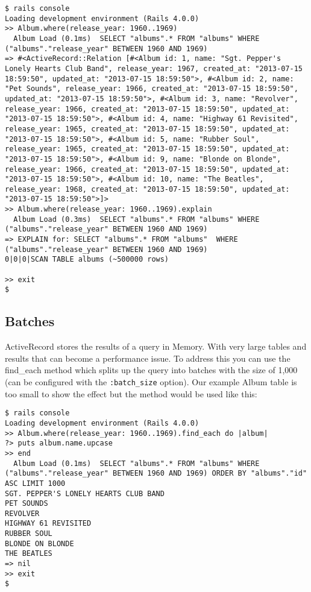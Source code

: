 \documentclass[a4paper]{book}
\newcounter{tab}[chapter]
\begin{document}
\begin{shaded}\begin{verbatim}
$ rails console
Loading development environment (Rails 4.0.0)
>> Album.where(release_year: 1960..1969)
  Album Load (0.1ms)  SELECT "albums".* FROM "albums" WHERE ("albums"."release_year" BETWEEN 1960 AND 1969)
=> #<ActiveRecord::Relation [#<Album id: 1, name: "Sgt. Pepper's Lonely Hearts Club Band", release_year: 1967, created_at: "2013-07-15 18:59:50", updated_at: "2013-07-15 18:59:50">, #<Album id: 2, name: "Pet Sounds", release_year: 1966, created_at: "2013-07-15 18:59:50", updated_at: "2013-07-15 18:59:50">, #<Album id: 3, name: "Revolver", release_year: 1966, created_at: "2013-07-15 18:59:50", updated_at: "2013-07-15 18:59:50">, #<Album id: 4, name: "Highway 61 Revisited", release_year: 1965, created_at: "2013-07-15 18:59:50", updated_at: "2013-07-15 18:59:50">, #<Album id: 5, name: "Rubber Soul", release_year: 1965, created_at: "2013-07-15 18:59:50", updated_at: "2013-07-15 18:59:50">, #<Album id: 9, name: "Blonde on Blonde", release_year: 1966, created_at: "2013-07-15 18:59:50", updated_at: "2013-07-15 18:59:50">, #<Album id: 10, name: "The Beatles", release_year: 1968, created_at: "2013-07-15 18:59:50", updated_at: "2013-07-15 18:59:50">]>
>> Album.where(release_year: 1960..1969).explain
  Album Load (0.3ms)  SELECT "albums".* FROM "albums" WHERE ("albums"."release_year" BETWEEN 1960 AND 1969)
=> EXPLAIN for: SELECT "albums".* FROM "albums"  WHERE ("albums"."release_year" BETWEEN 1960 AND 1969)
0|0|0|SCAN TABLE albums (~500000 rows)

>> exit
$
\end{verbatim}\end{shaded}

\subsection{Batches}\label{batches}

ActiveRecord stores the results of a query in Memory. With very large tables and results that can become a performance issue. To address this you can use the find\_each method which splits up the query into batches with the size of 1,000 (can be configured with the \texttt{:batch\_size} option). Our example Album table is too small to show the effect but the method would be used like this:

\begin{shaded}\begin{verbatim}
$ rails console
Loading development environment (Rails 4.0.0)
>> Album.where(release_year: 1960..1969).find_each do |album|
?> puts album.name.upcase
>> end
  Album Load (0.1ms)  SELECT "albums".* FROM "albums" WHERE ("albums"."release_year" BETWEEN 1960 AND 1969) ORDER BY "albums"."id" ASC LIMIT 1000
SGT. PEPPER'S LONELY HEARTS CLUB BAND
PET SOUNDS
REVOLVER
HIGHWAY 61 REVISITED
RUBBER SOUL
BLONDE ON BLONDE
THE BEATLES
=> nil
>> exit
$
\end{verbatim}\end{shaded}
\end{document}
